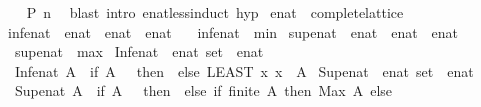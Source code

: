 \begin{isabellebody}
\ \ \isamarkupfalse%
\ {\isachardoublequoteopen}P\ n{\isachardoublequoteclose}\ \isamarkupfalse%
\ {\isacharparenleft}blast\ intro{\isacharcolon}\ enat{\isacharunderscore}less{\isacharunderscore}induct\ hyp{\isacharparenright}\isanewline
{}\isamarkupfalse%
%
\endisatagproof
{\isafoldproof}%
%
\isadelimproof
%
\endisadelimproof
%
\isadelimdocument
%
\endisadelimdocument
%
\isatagdocument
%
\isamarkuptrue%
%
\endisatagdocument
{\isafolddocument}%
%
\isadelimdocument
%
\endisadelimdocument
{}\isamarkupfalse%
\ enat\ {\isacharcolon}{\isacharcolon}\ complete{\isacharunderscore}lattice\isanewline
{}\isanewline
\isanewline
{}\isamarkupfalse%
\ inf{\isacharunderscore}enat\ {\isacharcolon}{\isacharcolon}\ {\isachardoublequoteopen}enat\ {\isasymRightarrow}\ enat\ {\isasymRightarrow}\ enat{\isachardoublequoteclose}\ \isanewline
\ \ {\isachardoublequoteopen}inf{\isacharunderscore}enat\ {\isacharequal}\ min{\isachardoublequoteclose}\isanewline
\isanewline
{}\isamarkupfalse%
\ sup{\isacharunderscore}enat\ {\isacharcolon}{\isacharcolon}\ {\isachardoublequoteopen}enat\ {\isasymRightarrow}\ enat\ {\isasymRightarrow}\ enat{\isachardoublequoteclose}\ \isanewline
\ \ {\isachardoublequoteopen}sup{\isacharunderscore}enat\ {\isacharequal}\ max{\isachardoublequoteclose}\isanewline
\isanewline
{}\isamarkupfalse%
\ Inf{\isacharunderscore}enat\ {\isacharcolon}{\isacharcolon}\ {\isachardoublequoteopen}enat\ set\ {\isasymRightarrow}\ enat{\isachardoublequoteclose}\ \isanewline
\ \ {\isachardoublequoteopen}Inf{\isacharunderscore}enat\ A\ {\isacharequal}\ {\isacharparenleft}if\ A\ {\isacharequal}\ {\isacharbraceleft}{\isacharbraceright}\ then\ {\isasyminfinity}\ else\ {\isacharparenleft}LEAST\ x{\isachardot}\ x\ {\isasymin}\ A{\isacharparenright}{\isacharparenright}{\isachardoublequoteclose}\isanewline
\isanewline
{}\isamarkupfalse%
\ Sup{\isacharunderscore}enat\ {\isacharcolon}{\isacharcolon}\ {\isachardoublequoteopen}enat\ set\ {\isasymRightarrow}\ enat{\isachardoublequoteclose}\ \isanewline
\ \ {\isachardoublequoteopen}Sup{\isacharunderscore}enat\ A\ {\isacharequal}\ {\isacharparenleft}if\ A\ {\isacharequal}\ {\isacharbraceleft}{\isacharbraceright}\ then\ {}\ else\ if\ finite\ A\ then\ Max\ A\ else\ {\isasyminfinity}{\isacharparenright}{\isachardoublequoteclose}\isanewline
{}\isamarkupfalse%

\end{isabellebody}
